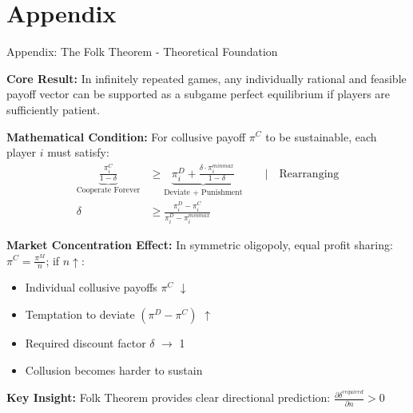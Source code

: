 \documentclass[10pt, aspectratio=169]{beamer}
\begin{document}

\appendix

\section{Appendix}

\begin{frame}{Appendix: The Folk Theorem - Theoretical Foundation}

    \textbf{Core Result:} In infinitely repeated games, any individually rational and feasible payoff vector can be supported as a subgame perfect equilibrium if players are sufficiently patient.
    
    \textbf{Mathematical Condition:}
    For collusive payoff $\pi^C$ to be sustainable, each player $i$ must satisfy:
    \begin{align*}
        \underbrace{\frac{\pi_i^C}{1-\delta}}_{\text{Cooperate Forever}} &\geq \underbrace{\pi_i^D + \frac{\delta \cdot \pi_i^{minmax}}{1-\delta}}_{\text{Deviate + Punishment}} \quad\quad \vert \quad\text{Rearranging} \\
        \delta &\geq \frac{\pi_i^D - \pi_i^C}{\pi_i^D - \pi_i^{minmax}}
    \end{align*}
    
    \textbf{Market Concentration Effect:}
    In symmetric oligopoly, equal profit sharing: $\pi^C = \frac{\pi^M}{n}$; if $n\uparrow$:
    \begin{multicols}{2}
        \begin{itemize}
            \item Individual collusive payoffs $\pi^C$ $\downarrow$
            \item Temptation to deviate $(\pi^D - \pi^C)$ $\uparrow$ 
            \item Required discount factor $\delta$ $\rightarrow$ 1
            \item Collusion becomes harder to sustain
        \end{itemize}
    \end{multicols}
    \textbf{Key Insight:}
    Folk Theorem provides clear directional prediction: $\frac{\partial \delta^{required}}{\partial n} > 0$ \hfill\hyperlink{app:researchquestion}{}
\end{frame}
\end{document}
